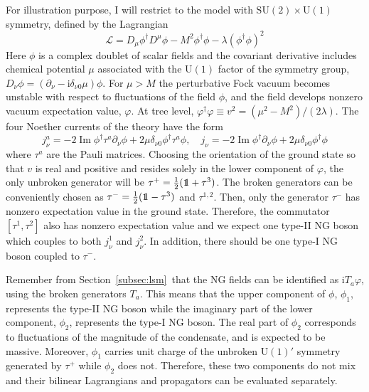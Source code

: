 \documentclass[final,2p,times,12pt,sort&compress]{elsarticle}
\newcommand\gr[1]{\mathrm{#1}}              %
\newcommand\Lag{\mathscr{L}}                %
\newcommand\he[1]{#1^{\dagger}}             %
\newcommand\imag{\mathrm i}                 %
\DeclareRobustCommand\openone{\leavevmode\hbox{\small1\normalsize\kern-.33em1}}
\newcommand\de{\partial}
\newcommand\vp{\varphi}
\DeclareMathOperator{\im}{Im}               %
\begin{document}
For illustration purpose, I will restrict to the model with $\gr{SU(2)\times
U(1)}$ symmetry, defined by the Lagrangian
\cite{Schafer:2001bq,Miransky:2001tw}
\begin{equation}
\Lag=D_\mu\he\phi D^\mu\phi-M^2\he\phi\phi-\lambda(\he\phi\phi)^2
\label{Lag_Miransky}
\end{equation}
Here $\phi$ is a complex doublet of scalar fields and the covariant derivative
includes chemical potential $\mu$ associated with the $\gr{U(1)}$ factor of the
symmetry group, $D_\nu\phi=(\de_\nu-\imag\delta_{\nu0}\mu)\phi$. For $\mu>M$
the perturbative Fock vacuum becomes unstable with respect to fluctuations of
the field $\phi$, and the field develops nonzero vacuum expectation value,
$\vp$. At tree level, $\he\vp\vp\equiv v^2=(\mu^2-M^2)/(2\lambda)$. The four
Noether currents of the theory have the form
\begin{equation}
j^a_\nu=-2\im\he\phi\tau^a\de_\nu\phi+2\mu\delta_{\nu0}\he\phi\tau^a\phi,\quad
j_\nu=-2\im\he\phi\de_\nu\phi+2\mu\delta_{\nu0}\he\phi\phi
\label{lsmcurrents}
\end{equation}
where $\tau^a$ are the Pauli matrices. Choosing the orientation of the ground
state so that $v$ is real and positive and resides solely in the lower
component of $\varphi$, the only unbroken generator will be
$\tau^+=\frac12(\openone+\tau^3)$. The broken generators can be conveniently
chosen as $\tau^-=\frac12(\openone-\tau^3)$ and $\tau^{1,2}$. Then, only the
generator $\tau^-$ has nonzero expectation value in the ground state.
Therefore, the commutator $[\tau^1,\tau^2]$ also has nonzero expectation value
and we expect one type-II NG boson which couples to both $j^1_\nu$ and
$j^2_\nu$. In addition, there should be one type-I NG boson coupled to
$\tau^-$.

Remember from Section~\ref{subsec:lsm}\ that the NG fields can be identified as
$\imag T_a\vp$, using the broken generators $T_a$. This means that the upper
component of $\phi$, $\phi_1$, represents the type-II NG boson while the
imaginary part of the lower component, $\phi_2$, represents the type-I NG boson.
The real part of $\phi_2$ corresponds to fluctuations of the magnitude of the
condensate, and is expected to be massive. Moreover, $\phi_1$ carries unit
charge of the unbroken $\gr{U(1)}'$ symmetry generated by $\tau^+$ while
$\phi_2$ does not. Therefore, these two components do not mix and their bilinear
Lagrangians and propagators can be evaluated separately.
\end{document}
